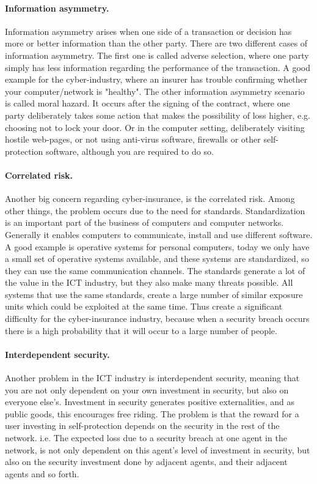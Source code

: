   \paragraph{Information asymmetry.}
Information asymmetry arises when one side of a transaction or decision has more or better information than the other party. There are two different cases of information asymmetry. The first one is called adverse selection, where one party simply has less information regarding the performance of the transaction. A good example for the cyber-industry, where an insurer has trouble confirming whether your computer/network is "healthy".
The other information asymmetry scenario is called moral hazard. It occurs after the signing of the contract, where one party deliberately takes some action that makes the possibility of loss higher, e.g. choosing not to lock your door. Or in the computer setting, deliberately visiting hostile web-pages, or not using anti-virus software, firewalls or other self-protection software, although you are required to do so. 
      
\paragraph{Correlated risk.}

Another big concern regarding cyber-insurance, is the correlated risk. Among other things, the problem occurs due to the need for standards. Standardization is an important part of the business of computers and computer networks. Generally it enables computers to communicate, install and use different software. A good example is operative systems for personal computers, today we only have a small set of operative systems available, and these systems are standardized, so they can use the same communication channels. The standards generate a lot of the value in the ICT industry, but they also make many threats possible. All systems that use the same standards, create a large number of similar exposure units which could be exploited at the same time. 
Thus create a significant difficulty for the cyber-insurance industry, because when a security breach occurs there is a high probability that it will occur to a large number of people.
 
 \paragraph{Interdependent security.}
Another problem in the ICT industry is interdependent security, meaning that you are not only dependent on your own investment in security, but also on everyone else's. 
Investment in security generates positive externalities, and as public goods, this encourages free riding. The problem is that the reward for a user investing in self-protection depends on the security in the rest of the network. i.e. The expected loss due to a security breach at one agent in the network, is not only dependent on this agent's level of investment in security, but also on the security investment done by adjacent agents, and their adjacent agents and so forth.
  
